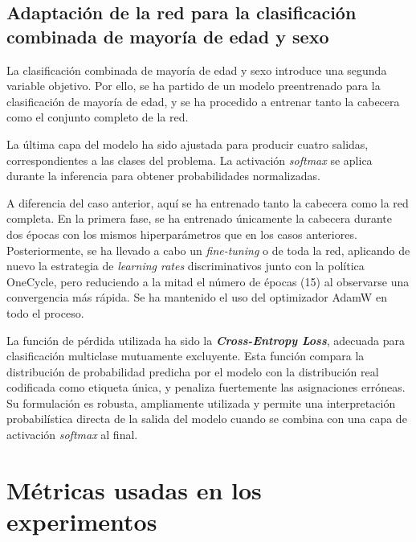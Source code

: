 
\subsection{Adaptación de la red para la clasificación combinada de mayoría de edad y sexo}

La clasificación combinada de mayoría de edad y sexo introduce una segunda variable objetivo. Por ello, se ha partido de un modelo preentrenado para la clasificación de mayoría de edad, y se ha procedido a entrenar tanto la cabecera como el conjunto completo de la red.

La última capa del modelo ha sido ajustada para producir cuatro salidas, correspondientes a las clases del problema. La activación \textit{softmax} se aplica durante la inferencia para obtener probabilidades normalizadas.

A diferencia del caso anterior, aquí se ha entrenado tanto la cabecera como la red completa. En la primera fase, se ha entrenado únicamente la cabecera durante dos épocas con los mismos hiperparámetros que en los casos anteriores. Posteriormente, se ha llevado a cabo un \textit{fine-tuning } o de toda la red, aplicando de nuevo la estrategia de \textit{learning rates} discriminativos junto con la política OneCycle, pero reduciendo a la mitad el número de épocas (15) al observarse una convergencia más rápida. Se ha mantenido el uso del optimizador AdamW en todo el proceso.

La función de pérdida utilizada ha sido la \textbf{\textit{Cross-Entropy Loss}}, adecuada para clasificación multiclase mutuamente excluyente. Esta función compara la distribución de probabilidad predicha por el modelo con la distribución real codificada como etiqueta única, y penaliza fuertemente las asignaciones erróneas. Su formulación es robusta, ampliamente utilizada y permite una interpretación probabilística directa de la salida del modelo cuando se combina con una capa de activación \textit{softmax} al final.


\section{Métricas usadas en los experimentos}

